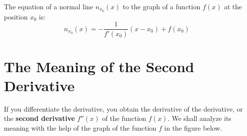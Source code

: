 \documentclass[12pt,eng]{skript_ogg}
\begin{document}
\begin{satz}
The equation of a normal line $n_{x_0}(x)$ to the graph of a function $f(x)$ at the position $x_0$ is:
\[n_{x_0}(x)=-\frac{1}{f'(x_0)}(x-x_0)+f(x_0)\]
\end{satz}

\newpage


\section{The Meaning of the Second Derivative}
If you differentiate the derivative, you obtain the derivative of the derivative, or the \textbf{second derivative} $f''(x)$ of the function $f(x)$. We shall analyze its meaning with the help of the graph of the function $f$ in the figure below. 

\vspace{-3mm}
\end{document}
